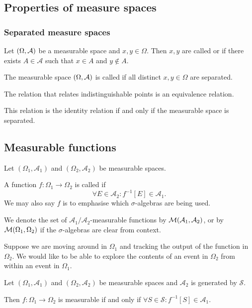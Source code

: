 \subsection{Properties of measure spaces}
\subsubsection{Separated measure spaces}
\begin{definition}
Let $\left( \Omega,\mathcal{A} \right)$ be a measurable space and $x,y\in \Omega$. Then $x,y$ are called  or  if there exists $A\in \mathcal{A}$ such that $x\in A$ and $y\notin A$.

The measurable space $\left( \Omega,\mathcal{A} \right)$ is called  if all distinct $x,y\in \Omega$ are separated.
\end{definition}

\begin{lemma}
The relation that relates indistinguishable points is an equivalence relation.

This relation is the identity relation \textup{if and only if} the measurable space is separated.
\end{lemma}

\subsection{Measurable functions}
\begin{definition}
Let $(\Omega_1, \mathcal{A}_1)$ and $(\Omega_2, \mathcal{A}_2)$ be measurable spaces.

A function $f:\Omega_1 \to \Omega_2$ is called  if
\[ \forall E\in\mathcal{A}_2: f^{-1}[E] \in\mathcal{A}_1. \]
We may also say $f$ is  to emphasise which $\sigma$-algebras are being used.

We denote the set of $\mathcal{A}_1/\mathcal{A}_2$-measurable functions by $\operatorname{\mathcal{M}}(\mathcal{A}_1, \mathcal{A}_2)$, or by $\operatorname{\mathcal{M}}(\Omega_1, \Omega_2)$ if the $\sigma$-algebras are clear from context.
\end{definition}
Suppose we are moving around in $\Omega_1$ and tracking the output of the function in $\Omega_2$. We would like to be able to explore the contents of an event in $\Omega_2$ from within an event in $\Omega_1$.

\begin{lemma} \label{measurableFromGeneratingSet}
Let $(\Omega_1, \mathcal{A}_1)$ and $(\Omega_2, \mathcal{A}_2)$ be measurable spaces and $\mathcal{A}_2$ is generated by $\mathcal{S}$.

Then $f: \Omega_1\to \Omega_2$ is measurable \textup{if and only if} $\forall S\in\mathcal{S}: f^{-1}[S] \in \mathcal{A}_1$.
\end{lemma}

